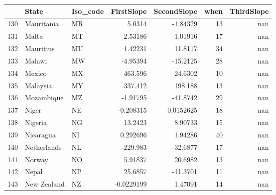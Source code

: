 \begin{tabular}{rllrrrr}
\hline
     & State                                                    & Iso\_code   &    FirstSlope &   SecondSlope &   when &   ThirdSlope \\
\hline
 130 & Mauritania                                               & MR         &    5.0314     &    -1.84329   &     13 &          nan \\
 131 & Malta                                                    & MT         &    2.53186    &    -1.01916   &     17 &          nan \\
 132 & Mauritius                                                & MU         &    1.42231    &    11.8117    &     34 &          nan \\
 133 & Malawi                                                   & MW         &   -4.95394    &   -15.2125    &     28 &          nan \\
 134 & Mexico                                                   & MX         &  463.596      &    24.6302    &     10 &          nan \\
 135 & Malaysia                                                 & MY         &  337.412      &   198.188     &     13 &          nan \\
 136 & Mozambique                                               & MZ         &   -1.91795    &   -41.8742    &     29 &          nan \\
 137 & Niger                                                    & NE         &   -0.208315   &     0.0152625 &     18 &          nan \\
 138 & Nigeria                                                  & NG         &   13.2423     &     8.90733   &     15 &          nan \\
 139 & Nicaragua                                                & NI         &    0.292696   &     1.94286   &     40 &          nan \\
 140 & Netherlands                                              & NL         & -229.983      &   -32.6877    &     17 &          nan \\
 141 & Norway                                                   & NO         &    5.91837    &    20.6982    &     13 &          nan \\
 142 & Nepal                                                    & NP         &   25.6857     &   -11.3701    &     11 &          nan \\
 143 & New Zealand                                              & NZ         &   -0.0229199  &     1.47091   &     14 &          nan \\

\end{tabular}

